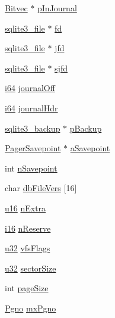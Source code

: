 \begin{DoxyCompactItemize}
\item 
\hyperlink{struct_bitvec}{Bitvec} $\ast$ \hyperlink{struct_pager_a530ea868337a7c0c4e7c125035f73737}{p\-In\-Journal}
\item 
\hyperlink{structsqlite3__file}{sqlite3\-\_\-file} $\ast$ \hyperlink{struct_pager_a005ff1960fc1550a870cd1dae418c99e}{fd}
\item 
\hyperlink{structsqlite3__file}{sqlite3\-\_\-file} $\ast$ \hyperlink{struct_pager_a81057c4420b8278e8141cf626abf4f0d}{jfd}
\item 
\hyperlink{structsqlite3__file}{sqlite3\-\_\-file} $\ast$ \hyperlink{struct_pager_a8196bcc97f184d480848895f71e080e6}{sjfd}
\item 
\hyperlink{sqlite3_8c_a2a0f0f4ae7001eb54351f77ea1cdbcfd}{i64} \hyperlink{struct_pager_ad3cffdc0987965fa6a472b19355f48df}{journal\-Off}
\item 
\hyperlink{sqlite3_8c_a2a0f0f4ae7001eb54351f77ea1cdbcfd}{i64} \hyperlink{struct_pager_a7f4a7f5f0245b063a82c185f40bad7f0}{journal\-Hdr}
\item 
\hyperlink{structsqlite3__backup}{sqlite3\-\_\-backup} $\ast$ \hyperlink{struct_pager_ae230d34da61bf28178fa1ac142a88c15}{p\-Backup}
\item 
\hyperlink{struct_pager_savepoint}{Pager\-Savepoint} $\ast$ \hyperlink{struct_pager_a4d5f4487316c026eceb8461e90fffcfd}{a\-Savepoint}
\item 
int \hyperlink{struct_pager_a020adae89ef6c1b28e51fffc3d4b22c9}{n\-Savepoint}
\item 
char \hyperlink{struct_pager_acf03a47838eee1cf474bb93dbc834b5f}{db\-File\-Vers} \mbox{[}16\mbox{]}
\item 
\hyperlink{sqlite3_8c_a20f2299e322dcbde37cb07b16910b843}{u16} \hyperlink{struct_pager_a44e153b2f756bfb86ab471c25893b3b6}{n\-Extra}
\item 
\hyperlink{sqlite3_8c_a7b32340f65cd15f029caad258fb3355c}{i16} \hyperlink{struct_pager_a82581087240713cab679108e3adeaf58}{n\-Reserve}
\item 
\hyperlink{sqlite3_8c_a03ad5adfaeb9b7640dde78a0cc390319}{u32} \hyperlink{struct_pager_a36f3333fe82c70a46a99f2f8f289a971}{vfs\-Flags}
\item 
\hyperlink{sqlite3_8c_a03ad5adfaeb9b7640dde78a0cc390319}{u32} \hyperlink{struct_pager_a4a47c73d7c18b803df33ba6c39baa5bf}{sector\-Size}
\item 
int \hyperlink{struct_pager_a9cfb910e7eaf8442f5414d722232a6e9}{page\-Size}
\item 
\hyperlink{sqlite3_8c_aec0c653e8dd16e4639caf2f8ea54f55c}{Pgno} \hyperlink{struct_pager_ad1d9a508ac764486a5eaef9b4f7781af}{mx\-Pgno}

\end{DoxyCompactItemize}

